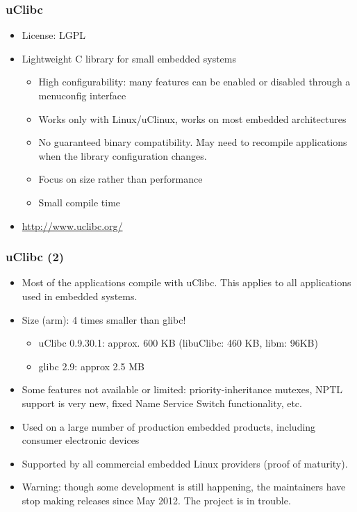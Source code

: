 \begin{frame}
  \frametitle{uClibc}
  \begin{itemize}
  \item License: LGPL
  \item Lightweight C library for small embedded systems
    \begin{itemize}
    \item High configurability: many features can be enabled or
      disabled through a menuconfig interface
    \item Works only with Linux/uClinux, works on most embedded
      architectures
    \item No guaranteed binary compatibility. May need to
      recompile applications when the library configuration changes.
    \item Focus on size rather than performance
    \item Small compile time
    \end{itemize}
  \item \url{http://www.uclibc.org/}
  \end{itemize}
\end{frame}

\begin{frame}
  \frametitle{uClibc (2)}
  \begin{itemize}
  \item Most of the applications compile with uClibc. This applies to
    all applications used in embedded systems.
  \item Size (arm): 4 times smaller than glibc!
    \begin{itemize}
    \item uClibc 0.9.30.1: approx. 600 KB (libuClibc: 460 KB, libm:
      96KB)
    \item glibc 2.9: approx 2.5 MB
    \end{itemize}
  \item Some features not available or limited: priority-inheritance
    mutexes, NPTL support is very new, fixed Name Service Switch
    functionality, etc.
  \item Used on a large number of production embedded products,
    including consumer electronic devices
  \item Supported by all commercial embedded Linux providers (proof of
        maturity).
  \item Warning: though some development is still happening,
        the maintainers have stop making releases since May 2012.
        The project is in trouble.
\end{itemize}
\end{frame}

